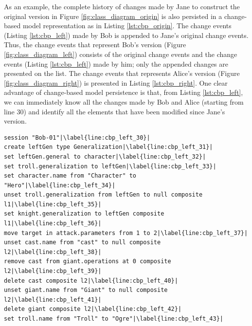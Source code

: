 As an example, the complete history of changes made by Jane to construct the original version in Figure \ref{fig:class_diagram_origin} is also persisted in a change-based model representation as in Listing \ref{lst:cbp_origin}. The change events (Listing \ref{lst:cbp_left}) made by Bob is appended to Jane's original change events. Thus, the change events that represent Bob's version (Figure \ref{fig:class_diagram_left}) consists of the original change events and the change events (Listing \ref{lst:cbp_left}) made by him; only the appended changes are presented on the list. The change events that represents Alice's version (Figure \ref{fig:class_diagram_right}) is presented in Listing \ref{lst:cbp_right}. One clear advantage of change-based model persistence is that, from Listing \ref{lst:cbp_left}, we can immediately know all the changes made by Bob and Alice (starting from line 30) and identify all the elements that have been modified since Jane's version.  

\begin{lstlisting}[firstnumber=30,style=eol,escapechar=|,caption={The appended events made by Bob to produce the left version in Figure \ref{fig:class_diagram_left} (left version).},label=lst:cbp_left]
session "Bob-01"|\label{line:cbp_left_30}|
create leftGen type Generalization|\label{line:cbp_left_31}|
set leftGen.general to character|\label{line:cbp_left_32}|
set troll.generalization to leftGen|\label{line:cbp_left_33}|
set character.name from "Character" to "Hero"|\label{line:cbp_left_34}|
unset troll.generalization from leftGen to null composite l1|\label{line:cbp_left_35}|
set knight.generalization to leftGen composite l1|\label{line:cbp_left_36}|
move target in attack.parameters from 1 to 2|\label{line:cbp_left_37}|
unset cast.name from "cast" to null composite l2|\label{line:cbp_left_38}|
remove cast from giant.operations at 0 composite l2|\label{line:cbp_left_39}|
delete cast composite l2|\label{line:cbp_left_40}|
unset giant.name from "Giant" to null composite l2|\label{line:cbp_left_41}|
delete giant composite l2|\label{line:cbp_left_42}|
set troll.name from "Troll" to "Ogre"|\label{line:cbp_left_43}|
\end{lstlisting}

